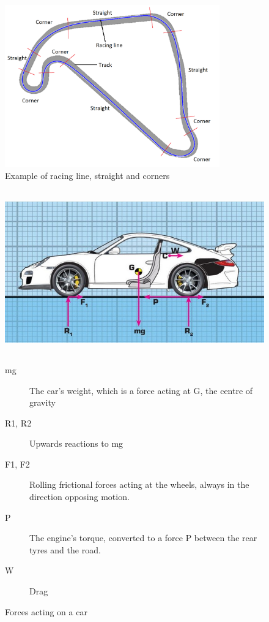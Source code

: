 \begin{figure}[!htb]
	\centering
	\includegraphics[height=7cm]{images/exampleofraceline}
	\caption{Example of racing line, straight and corners}
	\label{fig:circuit-breakdown}
\end{figure}

\begin{figure}[!htb]
	\centering
	\includegraphics[height=7cm]{images/forcesoncar}
	\caption{Forces acting on a car\cite{carscienceForces} }
	\begin{description}
		\item[mg] The car’s weight, which is a force acting at G, the centre of gravity
		\item[R1, R2] Upwards reactions to mg
		\item[F1, F2] Rolling frictional forces acting at the wheels, always in the direction opposing motion.
		\item[P] The engine’s torque, converted to a force P between the rear tyres and the road.	
		\item[W] Drag
	\end{description}
	\label{fig:forces-car}
\end{figure}

